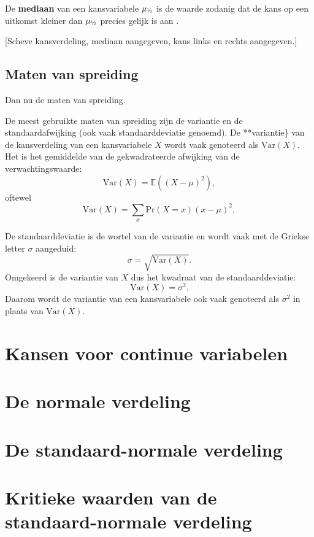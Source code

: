 \documentclass[
  a4paper,
]{scrbook}
\theoremstyle{definition}
\theoremstyle{definition}
\theoremstyle{remark}
\begin{document}
De \textbf{mediaan} van een kansvariabele \(\mu_\textrm{\textonehalf}\)
is de waarde zodanig dat de kans op een uitkomst kleiner dan
\(\mu_\textrm{\textonehalf}\) precies gelijk is aan \textonehalf.

{[}Scheve kansverdeling, mediaan aangegeven, kans links en rechts
aangegeven.{]}

\subsection{Maten van spreiding}\label{maten-van-spreiding}

Dan nu de maten van spreiding.

De meest gebruikte maten van spreiding zijn de variantie en de
standaardafwijking (ook vaak standaarddeviatie genoemd). De
**variantie\} van de kansverdeling van een kansvariabele \(X\) wordt
vaak genoteerd als \(\mathrm{Var}\!\left(X\right)\). Het is het
gemiddelde van de gekwadrateerde afwijking van de verwachtingswaarde:
\[ 
    \mathrm{Var}\!\left(X\right) = \mathbb{E}\!\left( \left( X - \mu \right)^2\right),
\] oftewel \[ 
    \mathrm{Var}\!\left(X\right) = \sum_x \textrm{Pr}\!\left(X = x\right) \left( x - \mu \right)^2,
\]

De standaarddeviatie is de wortel van de variantie en wordt vaak met de
Griekse letter \(\sigma\) aangeduid: \[
    \sigma = \sqrt{\mathrm{Var}\!\left(X\right)}.
\] Omgekeerd is de variantie van \(X\) dus het kwadraat van de
standaarddeviatie: \[
    \mathrm{Var}\!\left(X\right) = \sigma^2.
\] Daarom wordt de variantie van een kansvariabele ook vaak genoteerd
als \(\sigma^2\) in plaats van \(\mathrm{Var}\!\left(X\right)\).

\section{Kansen voor continue
variabelen}\label{kansen-voor-continue-variabelen}

\section{De normale verdeling}\label{de-normale-verdeling}

\section{De standaard-normale
verdeling}\label{de-standaard-normale-verdeling}

\section{Kritieke waarden van de standaard-normale
verdeling}\label{kritieke-waarden-van-de-standaard-normale-verdeling}
\end{document}
